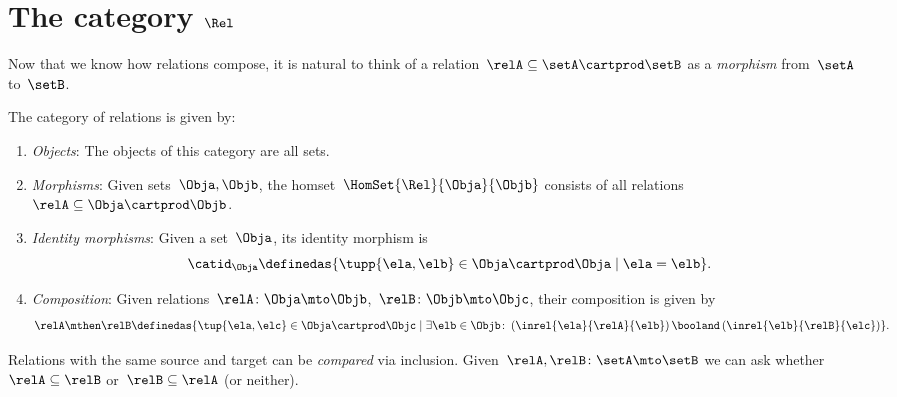 
\section[The category $\Rel$]{The category $\Rel$}
\label{sec:cat-of-relations}



Now that we know how relations compose, it is natural to think of a relation~$\relA \subseteq \setA \cartprod \setB$ as a \emph{morphism} from~$\setA$ to~$\setB$.

\begin{ctdefinition}
	\label{def:Rel}
	The category of relations \iindex{\Rel}  is given by:
	\begin{enumerate}
		\item \emph{Objects}: The objects of this category are all sets.
		\item \emph{Morphisms}: Given sets~$\Obja, \Objb$, the homset~$\HomSet{\Rel}{\Obja}{\Objb}$ consists of all relations~$\relA\subseteq \Obja\cartprod \Objb$.
		\item \emph{Identity morphisms}: Given a set~$\Obja$, its identity morphism is
		      \begin{equation}
			      \catid_\Obja \definedas \{ \tupp{\ela,\elb} \in \Obja \cartprod \Obja \mid  \ela = \elb \}.
		      \end{equation}
		\item \emph{Composition}: Given relations~$\relA \colon \Obja\mto \Objb$,~$\relB \colon \Objb\mto \Objc$, their composition is given by
		      \begin{equation}
			      \label{eq:RelCompRule}
			      \relA \mthen \relB \definedas \{\tup{\ela,\elc} \in \Obja \cartprod \Objc \mid  \exists \elb \in \Objb \colon \left(\inrel{\ela}{\relA}{\elb} \right) \booland \left(\inrel{\elb}{\relB}{\elc}\right)\}.
		      \end{equation}
	\end{enumerate}
\end{ctdefinition}

\begin{remark}
	Relations with the same source and target can be \emph{compared} via inclusion.
	Given~$\relA, \relB \colon \setA\mto \setB$  we can ask whether~$\relA\subseteq \relB$ or~$\relB\subseteq \relA$ (or neither).
\end{remark}